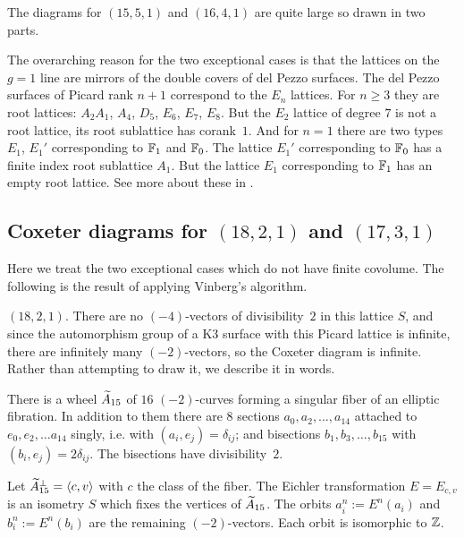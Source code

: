 \documentclass{amsart}
\begin{document}
The diagrams for $(15,5,1)$ and $(16,4,1)$ are quite large so drawn in
two parts. 

\begin{remark}
  The overarching reason for the two exceptional cases is that the
  lattices on the $g=1$ line are mirrors
  of the double covers
  of del Pezzo surfaces. The del Pezzo surfaces of Picard rank $n+1$
  correspond to the $E_n$ lattices. For $n\ge3$ they are root
  lattices: $A_2A_1$, $A_4$, $D_5$, $E_6$, $E_7$, $E_8$. But the $E_2$
  lattice of degree $7$ is not a root lattice, its root sublattice has
  corank~$1$. And for $n=1$ there are two types $E_1$, $E_1'$
  corresponding to ${\mathbb F}_1$ and ${\mathbb F}_0$. The lattice $E_1'$
  corresponding to ${\mathbb F}_0$ has a finite index root sublattice
  $A_1$. But the lattice $E_1$ corresponding to ${\mathbb F}_1$ has an empty
  root lattice. See more about these in
  \cite{alexeev2020compactifications-moduli}.
\end{remark}

\subsection{Coxeter diagrams for $(18,2,1)$ and $(17,3,1)$}
\label{sec:vinberg-exceptional}

Here we treat the two exceptional cases which do not have finite
covolume. The following is the result of applying Vinberg's algorithm.

\smallskip\underline{$(18,2,1)$}.
There are no 
$(-4)$-vectors of divisibility~$2$ in this lattice $S$, and since the automorphism
group of a K3 surface with this Picard lattice is infinite, there are
infinitely many $(-2)$-vectors, so the Coxeter diagram is
infinite. Rather than attempting to draw it, we describe it in words.

There is a wheel ${\widetilde A}_{15}$ of $16$ $(-2)$-curves forming a singular
fiber of an elliptic fibration. In addition to them there are $8$
sections $a_0, a_2, \dotsc, a_{14}$ attached to $e_0,e_2, \dotsc a_{14}$
singly, i.e. with $(a_i,e_j) =\delta_{ij}$; and bisections $b_1, b_3,
\dotsc, b_{15}$ with $(b_i,e_j) = 2\delta_{ij}$. The bisections
have divisibility~$2$. 

Let ${\widetilde A}_{15}^\perp = \langle c, v \rangle$ with $c$ the class of the
fiber. The Eichler transformation $E = E_{c,v}$
\cite[3.7]{scattone1987on-the-compactification-of-moduli}
is an isometry
$S$ which fixes the vertices of ${\widetilde A}_{15}$. The orbits
$a_i^{n} := E^n(a_i)$ and $b_i^{n} := E^n(b_i)$ are the remaining
$(-2)$-vectors. Each orbit is isomorphic to ${\mathbb Z}$.
\end{document}
